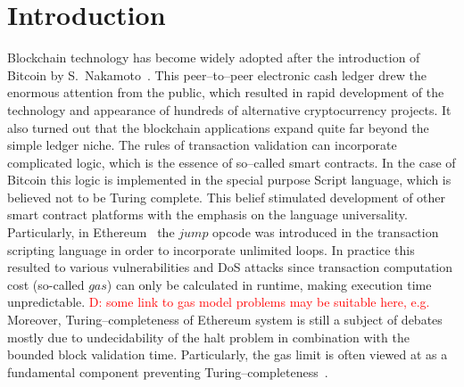 \documentclass[runningheads]{llncs}
\newcommand{\dnote}[1]{\textcolor{red}{D: {#1}}}
\begin{document}
    \section{Introduction}
    Blockchain technology has become widely adopted after the introduction of
    Bitcoin by S.~Nakamoto~\cite{nakamoto2008bitcoin}. This peer--to--peer
    electronic cash ledger drew the enormous attention from the public, which
    resulted in rapid development of the technology and appearance of hundreds
    of alternative cryptocurrency projects. It also turned out that the
    blockchain applications expand quite far beyond the simple ledger niche. The
    rules of transaction validation can incorporate complicated logic, which is
    the essence of so--called smart contracts. In the case of Bitcoin this logic
    is implemented in the special purpose Script language, which is believed not
    to be Turing complete. This belief stimulated development of other smart
    contract platforms with the emphasis on the language universality.
    Particularly, in Ethereum~\cite{buterin2014next} the $jump$ opcode was
    introduced in the transaction scripting language in order to incorporate
    unlimited loops.  In practice this resulted to various vulnerabilities and
    DoS attacks \cite{atzei2017survey} since transaction computation cost
    (so-called $gas$) can only be calculated in runtime, making execution time
    unpredictable. \dnote{some link to gas model problems may be suitable here,
    e.g. \cite{Earlz2017}} Moreover, Turing--completeness of Ethereum system is
    still a subject of debates mostly due to undecidability of the halt problem
    in combination with the bounded block validation time. Particularly, the gas
    limit is often viewed at as a fundamental component preventing
    Turing--completeness~\cite{miller2016ethereum}.
\end{document}
